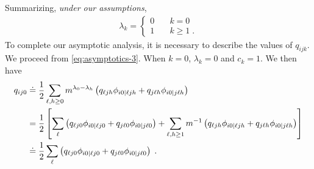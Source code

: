 Summarizing, \emph{under our assumptions}, 
\begin{align}
    \lambda_k = \begin{cases} 
        0 &\quad k = 0 \\ 
        1 &\quad k \geq 1\;.
    \end{cases}
\end{align}
To complete our asymptotic analysis, it is necessary to describe the values of $q_{ijk}$. 
We proceed from \cref{eq:asymptotics-3}. 
When $k = 0$, $\lambda_k = 0$ and $c_k = 1$. We then have 
\begin{align}
    q_{ij0} &\doteq \frac{1}{2}\sum_{\ell, h\geq 0} m^{\lambda_0-\lambda_h} \left(q_{\ell j h} \phi_{i0|\ell jh} + q_{j \ell h} \phi_{i0|j\ell h}\right) \\ 
    &= \frac{1}{2}\left[\sum_{\ell} \left(q_{\ell j 0} \phi_{i0|\ell j0} + q_{j \ell 0} \phi_{i0|j\ell 0}\right) + \sum_{\ell, h\geq 1} m^{-1} \left(q_{\ell j h} \phi_{i0|\ell jh} + q_{j \ell h} \phi_{i0|j\ell h}\right)\right]  \\
    &\doteq \frac{1}{2}\sum_{\ell} \left(q_{\ell j 0} \phi_{i0|\ell j0} + q_{j \ell 0} \phi_{i0|j\ell 0}\right)\;. \label{eq:system-1}
\end{align}
